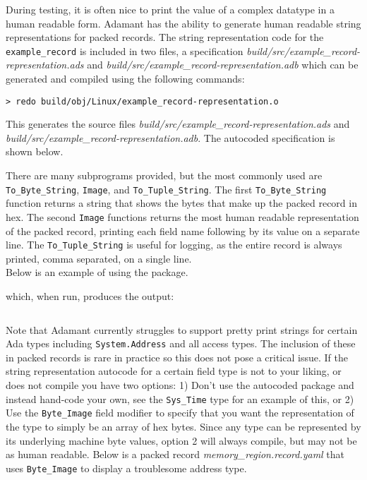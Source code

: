During testing, it is often nice to print the value of a complex datatype in a human readable form. Adamant has the ability to generate human readable string representations for packed records. The string representation code for the \texttt{example\_record} is included in two files, a specification \textit{build/src/example\_record-representation.ads} and \textit{build/src/example\_record-representation.adb} which can be generated and compiled using the following commands: 

\vspace{5mm} %
\begin{verbatim}
> redo build/obj/Linux/example_record-representation.o
\end{verbatim}
\vspace{5mm} %

This generates the source files \textit{build/src/example\_record-representation.ads} and \textit{build/src/example\_record-representation.adb}. The autocoded specification is shown below.


There are many subprograms provided, but the most commonly used are \texttt{To\_Byte\_String}, \texttt{Image}, and \texttt{To\_Tuple\_String}. The first \texttt{To\_Byte\_String} function returns a string that shows the bytes that make up the packed record in hex. The second \texttt{Image} functions returns the most human readable representation of the packed record, printing each field name following by its value on a separate line. The \texttt{To\_Tuple\_String} is useful for logging, as the entire record is always printed, comma separated, on a single line. \\

Below is an example of using the package.


which, when run, produces the output:

\vspace{5mm} %
\inputminted{text}{../example_architecture/record_representation/output.txt}
\vspace{5mm} %

Note that Adamant currently struggles to support pretty print strings for certain Ada types including \texttt{System.Address} and all access types. The inclusion of these in packed records is rare in practice so this does not pose a critical issue. If the string representation autocode for a certain field type is not to your liking, or does not compile you have two options: 1) Don't use the autocoded package and instead hand-code your own, see the \texttt{Sys\_Time} type for an example of this, or 2) Use the \texttt{Byte\_Image} field modifier to specify that you want the representation of the type to simply be an array of hex bytes. Since any type can be represented by its underlying machine byte values, option 2 will always compile, but may not be as human readable. Below is a packed record \textit{memory\_region.record.yaml} that uses \texttt{Byte\_Image} to display a troublesome address type.

